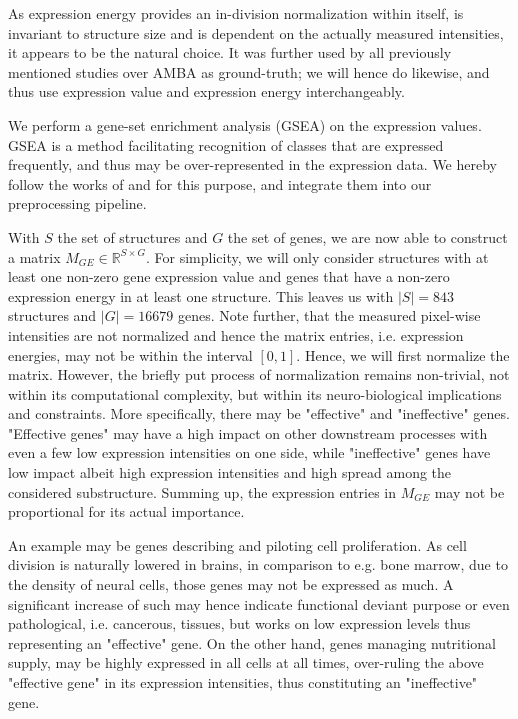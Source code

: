 \documentclass[]{article}
\begin{document}
 As expression energy provides an in-division normalization within itself, is invariant to structure size and is dependent on the actually measured intensities, it appears to be the natural choice. It was further used by all previously mentioned studies over AMBA as ground-truth; we will hence do likewise, and thus use expression value and expression energy interchangeably.

We perform a gene-set enrichment analysis (GSEA) on the expression values. GSEA is a method facilitating recognition of classes that are expressed frequently, and thus may be over-represented in the expression data. We hereby follow the works of \citet{subramanian2007gsea} and \citet{kuleshov2016enrichr} for this purpose, and integrate them into our preprocessing pipeline.

With $S$ the set of structures and $G$ the set of genes, we are now able to construct a matrix $M_{GE}\in \mathbb{R}^{S\times G}$. For simplicity, we will only consider structures with at least one non-zero gene expression value and genes that have a non-zero expression energy in at least one structure. This leaves us with $|S|=843$ structures and $|G|=16679$ genes. Note further, that the measured pixel-wise intensities are not normalized and hence the matrix entries, i.e. expression energies, may not be within the interval $[0,1]$. Hence, we will first normalize the matrix. 
However, the briefly put process of normalization remains non-trivial, not within its computational complexity, but within its neuro-biological implications and constraints. More specifically, there may be "effective" and "ineffective" genes. "Effective genes" may have a high impact on other downstream processes with even a few low expression intensities on one side, while "ineffective" genes have low impact albeit high expression intensities and high spread among the considered substructure. Summing up, the expression entries in $M_{GE}$ may not be proportional for its actual importance. 

An example may be genes describing and piloting cell proliferation. As cell division is naturally lowered in brains, in comparison to e.g. bone marrow, due to the density of neural cells, those genes may not be expressed as much. A significant increase of such may hence indicate functional deviant purpose or even pathological, i.e. cancerous, tissues, but works on low expression levels thus representing an "effective" gene. On the other hand, genes managing nutritional supply, may be highly expressed in all cells at all times, over-ruling the above "effective gene" in its expression intensities, thus constituting an "ineffective" gene.
\end{document}
